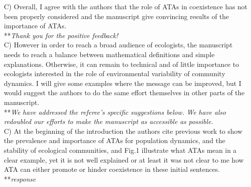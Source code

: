\documentclass[letterpaper,11pt]{article}
\begin{document}
\noindent C) Overall, I agree with the authors that the role of ATAs in coexistence has not been properly considered and the manuscript give convincing results of the importance of ATAs. \\

\noindent ***\emph{Thank you for the positive feedback!} \\

\noindent C) However in order to reach a broad audience of ecologists, the manuscript needs to reach a balance between mathematical definitions and simple explanations. Otherwise, it can remain to technical and of little importance to ecologists interested in the role of environmental variability of community dynamics. I will give some examples where the message can be improved, but I would suggest the authors to do the same effort themselves in other parts of the manuscript. \\

\noindent ***\emph{We have addressed the referee's specific suggestions below. We have also redoubled our
efforts to make the manuscript as accessible as possible.} \\

\noindent C) At the beginning of the introduction the authors cite previous work to show the prevalence and importance of ATAs for population dynamics, and the stability of ecological communities, and Fig.1 illustrate what ATAs mean in a clear example, yet it is not well explained or at least it was not clear to me how ATA can either promote or hinder coexistence in these initial sentences. \\

\noindent ***\emph{response} \\
%
\end{document}
